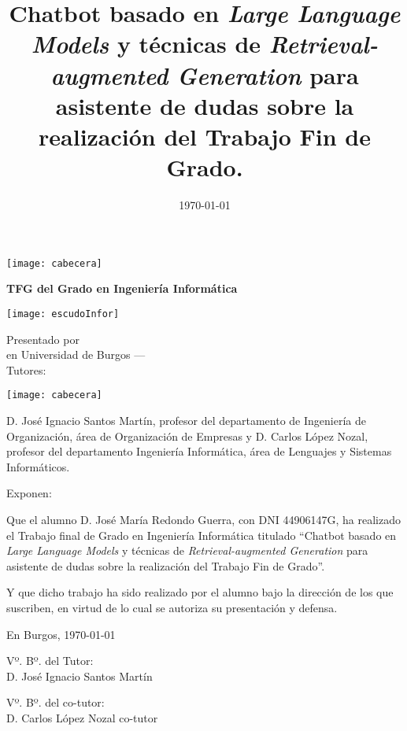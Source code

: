 \documentclass[a4paper,12pt,twoside]{memoir}
\title{Chatbot basado en \textit{Large Language Models} y técnicas de \textit{Retrieval-augmented Generation} para asistente de dudas sobre la realización del Trabajo Fin de Grado.}
\author{\nombre}
\date{\today}
\makeatletter
\def\maketitle{
  \null
  \thispagestyle{empty}
\noindent\texttt{[image: cabecera]}\vspace{1cm}%
  \vfill
  \colorbox{cpardoBox}{%
    \begin{minipage}{.8\textwidth}
      \vspace{.5cm}\Large
      \begin{center}
      \textbf{TFG del Grado en Ingeniería Informática}\vspace{.6cm}\\
      \textbf{\LARGE\@title{}}
      \end{center}
      \vspace{.2cm}
    \end{minipage}

  }%
  \hfill\begin{minipage}{.20\textwidth}
    \texttt{[image: escudoInfor]}
  \end{minipage}
  \vfill
  \begin{center}%
  {%
    \noindent\LARGE
    Presentado por \@author{}\\ 
    en Universidad de Burgos --- \@date{}\\
    Tutores: \@tutor{}\\
  }%
  \end{center}%
  \null
  \cleardoublepage
  }
\newcommand{\nombre}{José María Redondo Guerra} %
\makeatother
\begin{document}
\maketitle


\newpage\null\thispagestyle{empty}\newpage


\thispagestyle{empty}


\noindent\texttt{[image: cabecera]}\vspace{1cm}

\noindent D. José Ignacio Santos Martín, profesor del departamento de Ingeniería de Organización, área de Organización de Empresas y D. Carlos López Nozal, profesor del departamento Ingeniería Informática, área de Lenguajes y Sistemas Informáticos.

\noindent Exponen:

\noindent Que el alumno D. \nombre, con DNI 44906147G, ha realizado el Trabajo final de Grado en Ingeniería Informática titulado ``Chatbot basado en \textit{Large Language Models} y técnicas de \textit{Retrieval-augmented Generation} para asistente de dudas sobre la realización del Trabajo Fin de Grado''. 

\noindent Y que dicho trabajo ha sido realizado por el alumno bajo la dirección de los que suscriben, en virtud de lo cual se autoriza su presentación y defensa.

\begin{center} %
En Burgos, {\large \today}
\end{center}

\vfill\vfill\vfill

\begin{minipage}{0.45\textwidth}
\begin{flushleft} %
Vº. Bº. del Tutor:\\[2cm]
D. José Ignacio Santos Martín
\end{flushleft}
\end{minipage}
\hfill
\begin{minipage}{0.45\textwidth}
\begin{flushleft} %
Vº. Bº. del co-tutor:\\[2cm]
D. Carlos López Nozal co-tutor
\end{flushleft}
\end{minipage}
\hfill

\vfill

\end{document}
